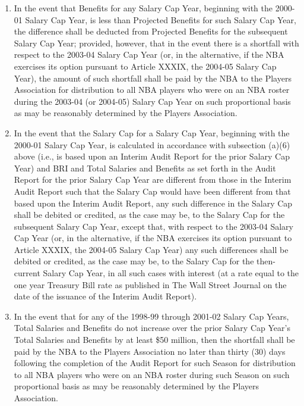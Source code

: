 \documentclass[
]{book}
\begin{document}
\begin{enumerate}
\begin{enumerate}
  \item
    In the event that Benefits for any Salary Cap Year, beginning with the 2000-01 Salary Cap Year, is less than Projected Benefits for such Salary Cap Year, the difference shall be deducted from Projected Benefits for the subsequent Salary Cap Year; provided, however, that in the event there is a shortfall with respect to the 2003-04 Salary Cap Year (or, in the alternative, if the NBA exercises its option pursuant to Article XXXIX, the 2004-05 Salary Cap Year), the amount of such shortfall shall be paid by the NBA to the Players Association for distribution to all NBA players who were on an NBA roster during the 2003-04 (or 2004-05) Salary Cap Year on such proportional basis as may be reasonably determined by the Players Association.
  \item
    In the event that the Salary Cap for a Salary Cap Year, beginning with the 2000-01 Salary Cap Year, is calculated in accordance with subsection (a)(6) above (i.e., is based upon an Interim Audit Report for the prior Salary Cap Year) and BRI and Total Salaries and Benefits as set forth in the Audit Report for the prior Salary Cap Year are different from those in the Interim Audit Report such that the Salary Cap would have been different from that based upon the Interim Audit Report, any such difference in the Salary Cap shall be debited or credited, as the case may be, to the Salary Cap for the subsequent Salary Cap Year, except that, with respect to the 2003-04 Salary Cap Year (or, in the alternative, if the NBA exercises its option pursuant to Article XXXIX, the 2004-05 Salary Cap Year) any such differences shall be debited or credited, as the case may be, to the Salary Cap for the then-current Salary Cap Year, in all such cases with interest (at a rate equal to the one year Treasury Bill rate as published in The Wall Street Journal on the date of the issuance of the Interim Audit Report).
  \item
    In the event that for any of the 1998-99 through 2001-02 Salary Cap Years, Total Salaries and Benefits do not increase over the prior Salary Cap Year's Total Salaries and Benefits by at least \$50 million, then the shortfall shall be paid by the NBA to the Players Association no later than thirty (30) days following the completion of the Audit Report for such Season for distribution to all NBA players who were on an NBA roster during such Season on such proportional basis as may be reasonably determined by the Players Association.
  \end{enumerate}
\end{enumerate}
\end{document}

